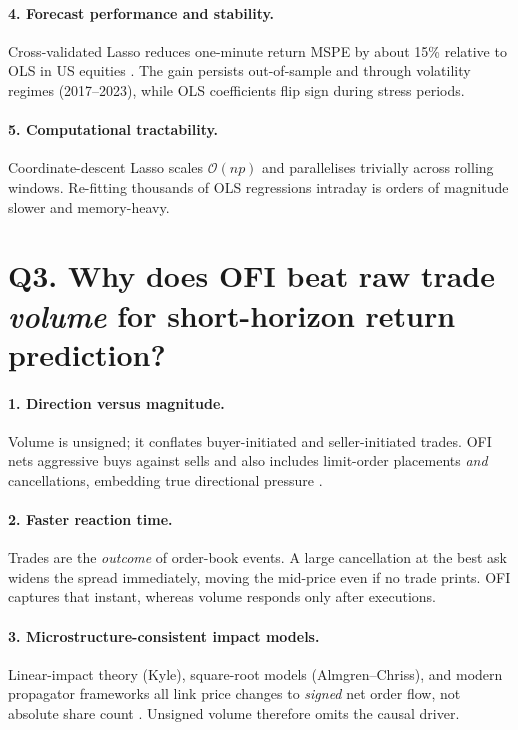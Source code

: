 \documentclass[11pt]{article}
\begin{document}
\paragraph{4. Forecast performance and stability.}
Cross-validated Lasso reduces one-minute return MSPE by about 15\% relative to OLS in US equities \citep{Cont2023}.  The gain persists out-of-sample and through volatility regimes (2017–2023), while OLS coefficients flip sign during stress periods.

\paragraph{5. Computational tractability.}
Coordinate-descent Lasso scales $\mathcal{O}(np)$ and parallelises trivially across rolling windows.  Re-fitting thousands of OLS regressions intraday is orders of magnitude slower and memory-heavy.

\bigskip
\section*{Q3. Why does OFI beat raw trade \textit{volume} for short-horizon return prediction?}

\paragraph{1. Direction versus magnitude.}
Volume is unsigned; it conflates buyer-initiated and seller-initiated trades.  OFI nets aggressive buys against sells and also includes limit-order placements \emph{and} cancellations, embedding true directional pressure \citep{Kyle1985, Cont2014}.

\paragraph{2. Faster reaction time.}
Trades are the \textit{outcome} of order-book events.  A large cancellation at the best ask widens the spread immediately, moving the mid-price even if no trade prints.  OFI captures that instant, whereas volume responds only after executions.

\paragraph{3. Microstructure-consistent impact models.}
Linear-impact theory (Kyle), square-root models (Almgren--Chriss), and modern propagator frameworks all link price changes to \emph{signed} net order flow, not absolute share count \citep{AlmgrenChriss2001, Gatheral2010}.  Unsigned volume therefore omits the causal driver.
\end{document}
